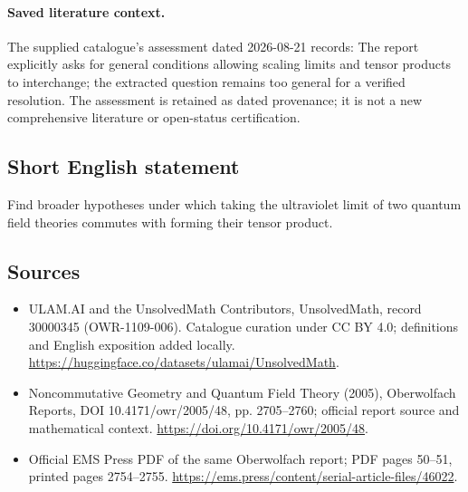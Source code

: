 \documentclass[11pt]{article}
\begin{document}
\paragraph{Saved literature context.} The supplied catalogue's assessment dated 2026-08-21 records: The report explicitly asks for general conditions allowing scaling limits and tensor products to interchange; the extracted question remains too general for a verified resolution. The assessment is retained as dated provenance; it is not a new comprehensive literature or open-status certification.
\subsection{Short English statement}
Find broader hypotheses under which taking the ultraviolet limit of two quantum field theories commutes with forming their tensor product.
\subsection{Sources}
\begin{itemize}
\item[\hypertarget{source:30000345:1}{S1}] ULAM.AI and the UnsolvedMath Contributors, UnsolvedMath, record 30000345 (OWR-1109-006). Catalogue curation under CC BY 4.0; definitions and English exposition added locally.
\url{https://huggingface.co/datasets/ulamai/UnsolvedMath}.
\item[\hypertarget{source:30000345:2}{S2}] Noncommutative Geometry and Quantum Field Theory (2005), Oberwolfach Reports, DOI 10.4171/owr/2005/48, pp. 2705--2760; official report source and mathematical context.
\url{https://doi.org/10.4171/owr/2005/48}.
\item[\hypertarget{source:30000345:3}{S3}] Official EMS Press PDF of the same Oberwolfach report; PDF pages 50--51, printed pages 2754--2755.
\url{https://ems.press/content/serial-article-files/46022}.
\end{itemize}
\label{end:30000345}
\end{document}
